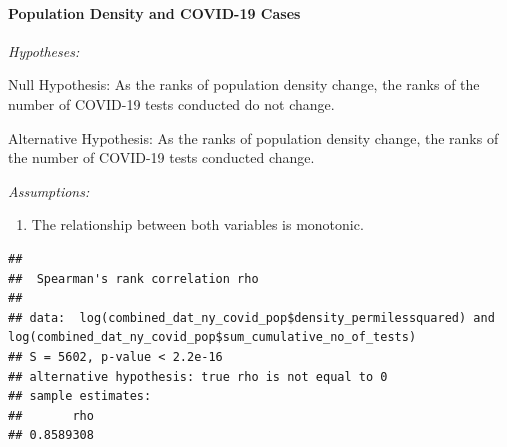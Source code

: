 \documentclass[
  12pt,
]{article}
\newenvironment{Shaded}{\begin{snugshade}}{\end{snugshade}}
\newcommand{\AttributeTok}[1]{\textcolor[rgb]{0.77,0.63,0.00}{#1}}
\newcommand{\CommentTok}[1]{\textcolor[rgb]{0.56,0.35,0.01}{\textit{#1}}}
\newcommand{\FunctionTok}[1]{\textcolor[rgb]{0.00,0.00,0.00}{#1}}
\newcommand{\NormalTok}[1]{#1}
\newcommand{\OtherTok}[1]{\textcolor[rgb]{0.56,0.35,0.01}{#1}}
\newcommand{\SpecialCharTok}[1]{\textcolor[rgb]{0.00,0.00,0.00}{#1}}
\newcommand{\StringTok}[1]{\textcolor[rgb]{0.31,0.60,0.02}{#1}}
\providecommand{\tightlist}{%
  \setlength{\itemsep}{0pt}\setlength{\parskip}{0pt}}
\begin{document}
\hypertarget{population-density-and-covid-19-cases-1}{%
\paragraph{Population Density and COVID-19
Cases}\label{population-density-and-covid-19-cases-1}}

\emph{Hypotheses:}

Null Hypothesis: As the ranks of population density change, the ranks of
the number of COVID-19 tests conducted do not change.

Alternative Hypothesis: As the ranks of population density change, the
ranks of the number of COVID-19 tests conducted change.

\emph{Assumptions:}

\begin{enumerate}
\def\labelenumi{\arabic{enumi}.}
\tightlist
\item
  The relationship between both variables is monotonic.
\end{enumerate}

\begin{Shaded}
\end{Shaded}

\begin{verbatim}
## 
##  Spearman's rank correlation rho
## 
## data:  log(combined_dat_ny_covid_pop$density_permilessquared) and log(combined_dat_ny_covid_pop$sum_cumulative_no_of_tests)
## S = 5602, p-value < 2.2e-16
## alternative hypothesis: true rho is not equal to 0
## sample estimates:
##       rho 
## 0.8589308
\end{verbatim}
\end{document}
